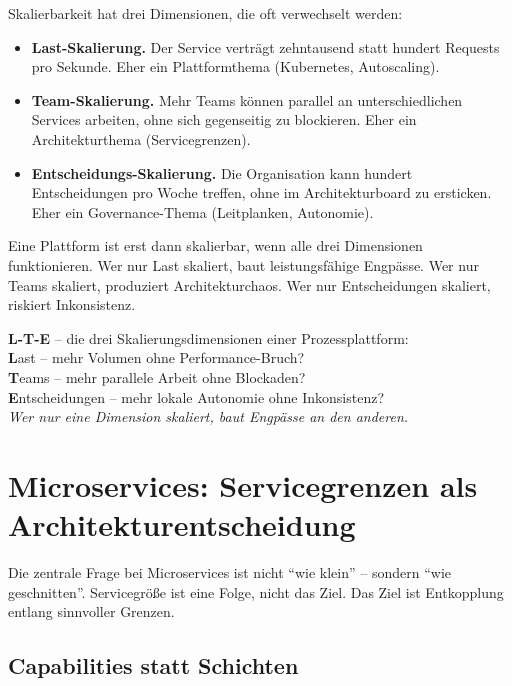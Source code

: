 \documentclass[11pt,a4paper,oneside]{article}
\newcommand{\caveatfontfallback}{\itshape}
\newcommand\caveatfont{\caveatfontfallback}%
\newcommand{\akzent}[1]{{\caveatfont\color{lpAmber}#1}}
\newcommand{\fachbegriff}[1]{\textbf{#1}}
\begin{document}
Skalierbarkeit hat drei Dimensionen, die oft verwechselt werden:

\begin{itemize}
  \item \fachbegriff{Last-Skalierung.} Der Service verträgt zehntausend statt hundert Requests pro Sekunde. Eher ein Plattformthema (Kubernetes, Autoscaling).
  \item \fachbegriff{Team-Skalierung.} Mehr Teams können parallel an unterschiedlichen Services arbeiten, ohne sich gegenseitig zu blockieren. Eher ein Architekturthema (Servicegrenzen).
  \item \fachbegriff{Entscheidungs-Skalierung.} Die Organisation kann hundert Entscheidungen pro Woche treffen, ohne im Architekturboard zu ersticken. Eher ein Governance-Thema (Leitplanken, Autonomie).
\end{itemize}

Eine Plattform ist erst dann skalierbar, wenn alle drei Dimensionen funktionieren. Wer nur Last skaliert, baut leistungsfähige Engpässe. Wer nur Teams skaliert, produziert Architekturchaos. Wer nur Entscheidungen skaliert, riskiert Inkonsistenz.

\begin{eselsbox}[Eselsbrücke: \akzent{L-T-E}]
\textbf{L-T-E} -- die drei Skalierungsdimensionen einer Prozessplattform:\\[2pt]
\textbf{L}ast -- mehr Volumen ohne Performance-Bruch?\\
\textbf{T}eams -- mehr parallele Arbeit ohne Blockaden?\\
\textbf{E}ntscheidungen -- mehr lokale Autonomie ohne Inkonsistenz?\\[2pt]
\emph{Wer nur eine Dimension skaliert, baut Engpässe an den anderen.}
\end{eselsbox}

\section{Microservices: Servicegrenzen als Architekturentscheidung}

Die zentrale Frage bei Microservices ist nicht ``wie klein'' -- sondern ``wie geschnitten''. Servicegröße ist eine Folge, nicht das Ziel. Das Ziel ist Entkopplung entlang sinnvoller Grenzen.

\subsection{Capabilities statt Schichten}
\end{document}
